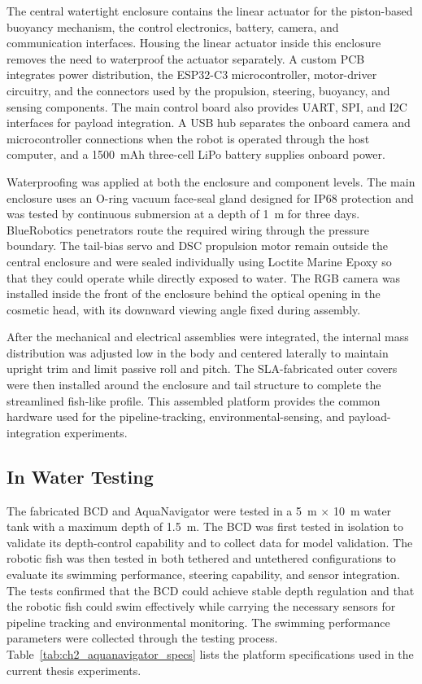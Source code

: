\documentclass{uhcoethesis}
\begin{document}
The central watertight enclosure contains the linear actuator for the piston-based buoyancy mechanism, the control electronics, battery, camera, and communication interfaces. Housing the linear actuator inside this enclosure removes the need to waterproof the actuator separately. A custom PCB integrates power distribution, the ESP32-C3 microcontroller, motor-driver circuitry, and the connectors used by the propulsion, steering, buoyancy, and sensing components. The main control board also provides UART, SPI, and I2C interfaces for payload integration. A USB hub separates the onboard camera and microcontroller connections when the robot is operated through the host computer, and a 1500~mAh three-cell LiPo battery supplies onboard power.

Waterproofing was applied at both the enclosure and component levels. The main enclosure uses an O-ring vacuum face-seal gland designed for IP68 protection and was tested by continuous submersion at a depth of 1~m for three days. BlueRobotics penetrators route the required wiring through the pressure boundary. The tail-bias servo and DSC propulsion motor remain outside the central enclosure and were sealed individually using Loctite Marine Epoxy so that they could operate while directly exposed to water. The RGB camera was installed inside the front of the enclosure behind the optical opening in the cosmetic head, with its downward viewing angle fixed during assembly.

After the mechanical and electrical assemblies were integrated, the internal mass distribution was adjusted low in the body and centered laterally to maintain upright trim and limit passive roll and pitch. The SLA-fabricated outer covers were then installed around the enclosure and tail structure to complete the streamlined fish-like profile. This assembled platform provides the common hardware used for the pipeline-tracking, environmental-sensing, and payload-integration experiments.

\subsection{In Water Testing}
The fabricated BCD and AquaNavigator were tested in a 5~m $\times$ 10~m water tank with a maximum depth of 1.5~m. The BCD was first tested in isolation to validate its depth-control capability and to collect data for model validation. The robotic fish was then tested in both tethered and untethered configurations to evaluate its swimming performance, steering capability, and sensor integration. The tests confirmed that the BCD could achieve stable depth regulation and that the robotic fish could swim effectively while carrying the necessary sensors for pipeline tracking and environmental monitoring. The swimming performance parameters were collected through the testing process. Table~\ref{tab:ch2_aquanavigator_specs} lists the platform specifications used in the current thesis experiments. 
\end{document}
